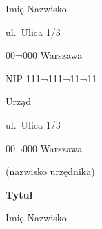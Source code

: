 \documentclass[12pt,notitlepage,oneside,a4paper]{article}
\begin{document}
\vskip2cm
Imię Nazwisko\par
ul.\ Ulica 1/3\par
00¬000 Warszawa\par
NIP 111¬111¬11¬11\par
{}
{
Urząd\par
ul.\ Ulica 1/3\par
00¬000 Warszawa\par
\medskip
(nazwisko urzędnika)\par}
\centerline{\textbf{Tytuł}}
\bigskip
\blindtext\par
\bigskip
\bigskip
{ Imię Nazwisko\par}
\end{document}
